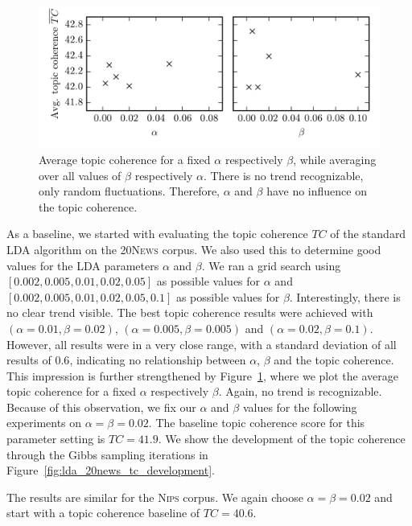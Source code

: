 \documentclass[
        a4paper,
        titlepage,
        twoside,
        parskip
        ]{scrbook}
\theoremstyle{break}
\begin{document}
\begin{figure}
       \centering
       \includegraphics[width=12cm]{figures/standard_lda_alpha_beta.png}
       \caption{Average topic coherence for a fixed $\alpha$ respectively $\beta$, while averaging over all values of $\beta$ respectively $\alpha$. There is no trend recognizable, only random fluctuations. Therefore, $\alpha$ and $\beta$ have no influence on the topic coherence.}
       \label{fig:standard_lda_alpha_beta}
\end{figure}
As a baseline, we started with evaluating the topic coherence $TC$ of the standard LDA algorithm on the \textsc{20News} corpus.
We also used this to determine good values for the LDA parameters $\alpha$ and $\beta$.
We ran a grid search using $[0.002, 0.005, 0.01, 0.02, 0.05]$ as possible values for $\alpha$ and $[0.002, 0.005, 0.01, 0.02, 0.05, 0.1]$ as possible values for $\beta$.
Interestingly, there is no clear trend visible.
The best topic coherence results were achieved with $(\alpha=0.01,\beta=0.02)$, $(\alpha=0.005,\beta=0.005)$ and $(\alpha=0.02,\beta=0.1)$.
However, all results were in a very close range, with a standard deviation of all results of $0.6$, indicating no relationship between $\alpha$, $\beta$ and the topic coherence.
This impression is further strengthened by Figure~\ref{fig:standard_lda_alpha_beta}, where we plot the average topic coherence for a fixed $\alpha$ respectively $\beta$.
Again, no trend is recognizable.
Because of this observation, we fix our $\alpha$ and $\beta$ values for the following experiments on $\alpha = \beta = 0.02$.
The baseline topic coherence score for this parameter setting is $TC = 41.9$.
We show the development of the topic coherence through the Gibbs sampling iterations in Figure~\ref{fig:lda_20news_tc_development}.

The results are similar for the \textsc{Nips} corpus.
We again choose $\alpha = \beta = 0.02$ and start with a topic coherence baseline of $TC = 40.6$.
\end{document}
